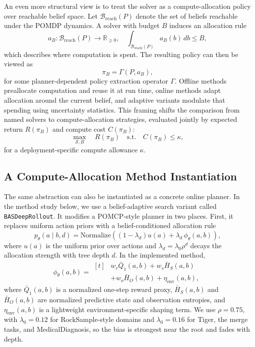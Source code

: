 \documentclass[10pt,twocolumn]{article}
\begin{document}
An even more structural view is to treat the solver as a compute-allocation policy over reachable belief space. Let $\mathcal{B}_{\mathrm{reach}}(P)$ denote the set of beliefs reachable under the POMDP dynamics. A solver with budget $B$ induces an allocation rule
\begin{equation}
a_B : \mathcal{B}_{\mathrm{reach}}(P) \to \mathbb{R}_{\ge 0},
\quad
\int_{\mathcal{B}_{\mathrm{reach}}(P)} a_B(b)\, db \le B,
\end{equation}
which describes where computation is spent. The resulting policy can then be viewed as
\begin{equation}
\pi_B = \Gamma(P, a_B),
\end{equation}
for some planner-dependent policy extraction operator $\Gamma$. Offline methods preallocate computation and reuse it at run time, online methods adapt allocation around the current belief, and adaptive variants modulate that spending using uncertainty statistics. This framing shifts the comparison from named solvers to compute-allocation strategies, evaluated jointly by expected return $R(\pi_B)$ and compute cost $C(\pi_B)$:
\begin{equation}
\max_{\mathcal{S},B} \quad R(\pi_B)
\quad \text{s.t.} \quad C(\pi_B) \le \kappa,
\end{equation}
for a deployment-specific compute allowance $\kappa$.

\subsection{A Compute-Allocation Method Instantiation}
The same abstraction can also be instantiated as a concrete online planner. In the method study below, we use a belief-adaptive search variant called \texttt{BASDeepRollout}. It modifies a POMCP-style planner in two places. First, it replaces uniform action priors with a belief-conditioned allocation rule
\begin{equation}
p_\theta(a \mid b,d)=\mathrm{Normalize}\!\left((1-\lambda_d)u(a)+\lambda_d\,\phi_\theta(a,b)\right),
\end{equation}
where $u(a)$ is the uniform prior over actions and $\lambda_d=\lambda_0\rho^d$ decays the allocation strength with tree depth $d$. In the implemented method,
\begin{equation}
\phi_\theta(a,b)=
\begin{aligned}[t]
&w_r \bar Q_1(a,b)+w_s \bar H_S(a,b)\\
&+w_o \bar H_O(a,b)+\eta_{\mathrm{env}}(a,b),
\end{aligned}
\end{equation}
where $\bar Q_1(a,b)$ is a normalized one-step reward proxy, $\bar H_S(a,b)$ and $\bar H_O(a,b)$ are normalized predictive state and observation entropies, and $\eta_{\mathrm{env}}(a,b)$ is a lightweight environment-specific shaping term. We use $\rho=0.75$, with $\lambda_0=0.12$ for RockSample-style domains and $\lambda_0=0.16$ for Tiger, the merge tasks, and MedicalDiagnosis, so the bias is strongest near the root and fades with depth.
\end{document}
